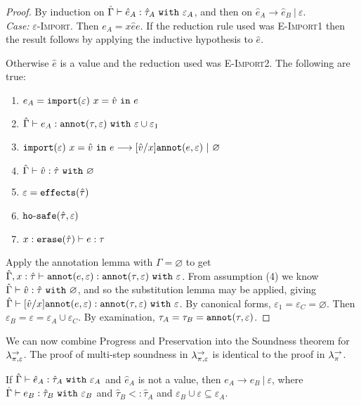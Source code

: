 \begin{proof} By induction on $\hat \Gamma \vdash \hat e_A: \hat \tau_A~\mathtt{with}~ \varepsilon_A$, and then on $\hat e_A \longrightarrow \hat e_B~|~\varepsilon$. \\

\textit{Case:} \textsc{$\varepsilon$-Import}. Then $e_A = {x}{\hat e}{e}$. If the reduction rule used was \textsc{E-Import1} then the result follows by applying the inductive hypothesis to $\hat e$.

Otherwise $\hat e$ is a value and the reduction used was \textsc{E-Import2}. The following are true:
\begin{enumerate}
	\setlength\itemsep{-0.7em}
	\item $e_A = \mathtt{import}(\varepsilon)~x = \hat v~\mathtt{in}~ e$
	\item $\hat \Gamma \vdash e_A: \mathtt{annot}(\tau, \varepsilon)~\mathtt{with}~ \varepsilon \cup \varepsilon_1$
	\item $\mathtt{import}(\varepsilon)~x = \hat v~\mathtt{in}~ e \longrightarrow [\hat v/x]\mathtt{annot}(e, \varepsilon)~|~\varnothing$
	\item $\hat \Gamma \vdash \hat v: \hat \tau~\mathtt{with}~ \varnothing$
	\item $\varepsilon = \mathtt{effects}(\hat \tau)$
	\item $\mathtt{ho \hbox{-} safe}(\hat \tau, \varepsilon)$
	\item $x: \mathtt{erase}(\hat \tau) \vdash e: \tau$
\end{enumerate}

\noindent
Apply the annotation lemma with $\Gamma = \varnothing$ to get $\hat \Gamma, x: \hat \tau \vdash \mathtt{annot}(e, \varepsilon): \mathtt{annot}(\tau, \varepsilon)~\mathtt{with}~ \varepsilon$. From assumption (4) we know $\hat \Gamma \vdash \hat v: \hat \tau~\mathtt{with}~ \varnothing$, and so the substitution lemma may be applied, giving $\hat \Gamma \vdash [\hat v/x]\mathtt{annot}(e, \varepsilon): \mathtt{annot}(\tau, \varepsilon)~\mathtt{with}~ \varepsilon$. By canonical forms, $\varepsilon_1 = \varepsilon_C = \varnothing$. Then $\varepsilon_B = \varepsilon = \varepsilon_A \cup \varepsilon_C$. By examination, $\tau_A = \tau_B = \mathtt{annot}(\tau, \varepsilon)$.
\end{proof}

We can now combine Progress and Preservation into the Soundness theorem for $\lambda^{\rightarrow}_{\pi, \varepsilon}$. The proof of multi-step soundness in $\lambda^{\rightarrow}_{\pi, \varepsilon}$ is identical to the proof in $\lambda^{\rightarrow}_{\pi}$.

\begin{theorem}[Soundness]
If $\hat \Gamma \vdash \hat e_A: \hat \tau_A~\mathtt{with}~ \varepsilon_A$ and $\hat e_A$ is not a value, then $e_A \longrightarrow e_B~|~\varepsilon$, where $\hat \Gamma \vdash e_B: \hat \tau_B~\mathtt{with}~ \varepsilon_B$ and $\hat \tau_B <: \hat \tau_A$ and $\varepsilon_B \cup \varepsilon \subseteq \varepsilon_A$.
\end{theorem}

